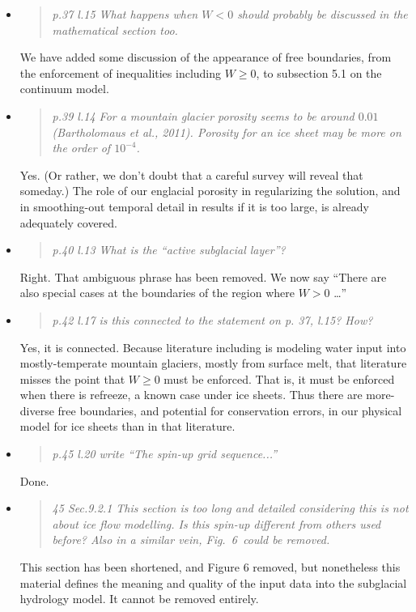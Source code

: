 \documentclass[11pt,reqno]{amsart}
\newcommand{\reply}[2]{
\medskip\medskip
\item  \begin{quote}
\emph{#1}
\end{quote}

\medskip
\noindent #2}
\begin{document}
\begin{itemize}
\reply{p.37 l.15 What happens when $W < 0$ should probably be discussed in the mathematical section too.}
{We have added some discussion of the appearance of free boundaries, from the enforcement of inequalities including $W\ge 0$, to subsection 5.1 on the continuum model.}

\reply{p.39 l.14 For a mountain glacier porosity seems to be around $0.01$ (Bartholomaus
et al., 2011).  Porosity for an ice sheet may be more on the order of $10^{-4}$.}
{Yes.  (Or rather, we don't doubt that a careful survey will reveal that someday.)  The role of our englacial porosity in regularizing the solution, and in smoothing-out temporal detail in results if it is too large, is already adequately covered.}

\reply{p.40 l.13 What is the ``active subglacial layer''?}
{Right.  That ambiguous phrase has been removed.  We now say ``There are also special cases at the boundaries of the region where $W > 0$ \dots''}

\reply{p.42 l.17 is this connected to the statement on p. 37, l.15? How?}
{Yes, it is connected.  Because literature including \cite{Hewittetal2012,Schoofetal2012,Werderetal2013} is modeling water input into mostly-temperate mountain glaciers, mostly from surface melt, that literature misses the point that $W\ge 0$ must be enforced.  That is, it must be enforced when there is refreeze, a known case under ice sheets.  Thus there are more-diverse free boundaries, and potential for conservation errors, in our physical model for ice sheets than in that literature.}

\reply{p.45 l.20 write ``The spin-up grid sequence...''}
{Done.}

\reply{45 Sec.9.2.1 This section is too long and detailed considering this is not about ice flow modelling.  Is this spin-up different from others used before?  Also in a similar
vein, Fig.~6~could be removed.}
{This section has been shortened, and Figure 6 removed, but nonetheless this material defines the meaning and quality of the input data into the subglacial hydrology model.  It cannot be removed entirely.}


\end{itemize}
\end{document}
